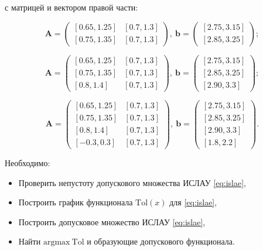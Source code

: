 \documentclass{article}
\begin{document}
  с матрицей и вектором правой части:

  \begin{equation} \label{eq:problem_1}
    \mathbf{A} = \begin{pmatrix}
      [0.65, 1.25] & [0.7, 1.3] \\
      [0.75, 1.35] & [0.7, 1.3]
    \end{pmatrix},
    ~
    \mathbf{b} = \begin{pmatrix}
      [2.75, 3.15] \\
      [2.85, 3.25]
    \end{pmatrix};
  \end{equation}

  \begin{equation} \label{eq:problem_2}
    \mathbf{A} = \begin{pmatrix}
      [0.65, 1.25] & [0.7, 1.3] \\
      [0.75, 1.35] & [0.7, 1.3] \\
      [0.8, 1.4] & [0.7, 1.3]
    \end{pmatrix},
    ~
    \mathbf{b} = \begin{pmatrix}
      [2.75, 3.15] \\
      [2.85, 3.25] \\
      [2.90, 3.3]
    \end{pmatrix};
  \end{equation}

  \begin{equation} \label{eq:problem_3}
    \mathbf{A} = \begin{pmatrix}
      [0.65, 1.25] & [0.7, 1.3] \\
      [0.75, 1.35] & [0.7, 1.3] \\
      [0.8, 1.4] & [0.7, 1.3] \\
      [-0.3, 0.3] & [0.7, 1.3]
    \end{pmatrix},
    ~
    \mathbf{b} = \begin{pmatrix}
      [2.75, 3.15] \\
      [2.85, 3.25] \\
      [2.90, 3.3] \\
      [1.8, 2.2]
    \end{pmatrix}.
  \end{equation}

  Необходимо:

  \begin{itemize}
    \item Проверить непустоту допускового множества ИСЛАУ \ref{eq:islae},
    \item Построить график функционала \( \text{Tol}(x) \) для \ref{eq:islae},
    \item Построить допусковое множество ИСЛАУ \ref{eq:islae},
    \item Найти \( \text{argmax} \ \text{Tol} \) и образующие допускового
      функционала.
  \end{itemize}
\end{document}
